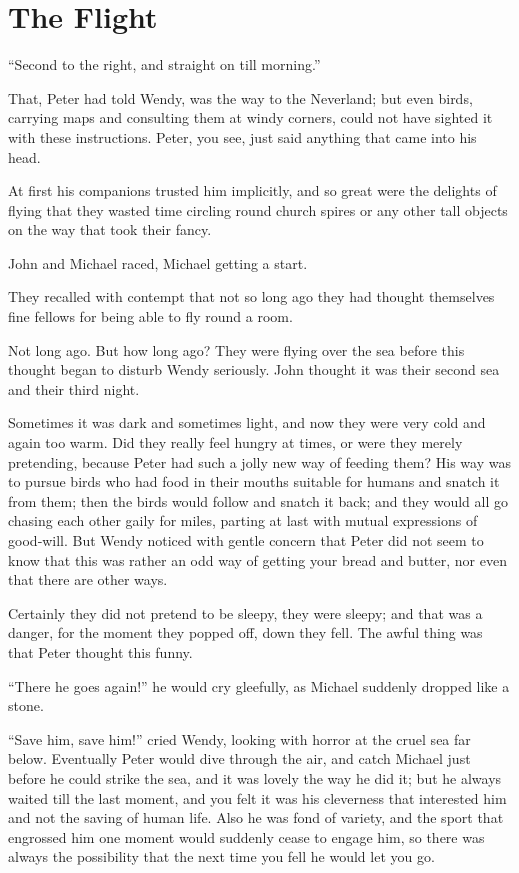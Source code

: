 
\chapter{The Flight}

\begin{center}
“Second to the right, and straight on till morning.”
\end{center}
That, Peter had told Wendy, was the way to the Neverland;
but even birds, carrying maps and consulting them at windy corners,
could not have sighted it with these instructions.
Peter, you see, just said anything that came into his head.

At first his companions trusted him implicitly,
and so great were the delights of flying
that they wasted time circling round church spires or any other tall objects on the way that took their fancy.

John and Michael raced, Michael getting a start.

They recalled with contempt that not so long ago they had thought themselves fine fellows
for being able to fly round a room.

Not long ago.
But how long ago?
They were flying over the sea before this thought began to disturb Wendy seriously.
John thought it was their second sea and their third night.

Sometimes it was dark and sometimes light,
and now they were very cold and again too warm.
Did they really feel hungry at times, or were they merely pretending,
because Peter had such a jolly new way of feeding them?
His way was to pursue birds who had food in their mouths suitable for humans and snatch it from them;
then the birds would follow and snatch it back;
and they would all go chasing each other gaily for miles,
parting at last with mutual expressions of good‐will.
But Wendy noticed with gentle concern
that Peter did not seem to know that this was rather an odd way of getting your bread and butter,
nor even that there are other ways.

Certainly they did not pretend to be sleepy, they were sleepy;
and that was a danger, for the moment they popped off, down they fell.
The awful thing was that Peter thought this funny.

“There he goes again!\@” he would cry gleefully, as Michael suddenly dropped like a stone.

“Save him, save him!\@” cried Wendy, looking with horror at the cruel sea far below.
Eventually Peter would dive through the air, and catch Michael just before he could strike the sea,
and it was lovely the way he did it;
but he always waited till the last moment,
and you felt it was his cleverness that interested him and not the saving of human life.
Also he was fond of variety, and the sport that engrossed him one moment would suddenly cease to engage him,
so there was always the possibility that the next time you fell he would let you go.

